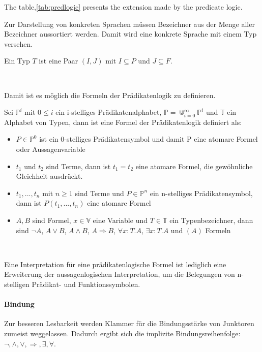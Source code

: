 The table,\ref{tab:predlogic} presents the extension made by the predicate logic.

\begin{defi}
  
\end{defi}


Zur Darstellung von konkreten Sprachen müssen Bezeichner aus der Menge aller
Bezeichner aussortiert werden. Damit wird eine konkrete Sprache mit einem Typ
versehen.
\begin{defi}
  Ein Typ $T$ ist eine Paar $(I,J)$ mit $I\subseteq P$ und $J\subseteq F$.
\end{defi}~\cite{heinemann2013logik}

Damit ist es möglich die Formeln der Prädikatenlogik zu definieren.

\begin{defi}
  Sei $\mathbb{P}^i$ mit $0\le i$ ein i-stelliges Prädikatenalphabet,
  $\mathbb{P}=\Cup^{\infty}_{i=0}\mathbb{P}^i$ und $\mathbb{T}$ ein Alphabet von Typen,
  dann ist eine Formel der Prädikatenlogik definiert als:
  \begin{itemize}
  \item $P\in\mathbb{P}^0$ ist ein 0-stelliges Prädikatensymbol und damit P eine
    atomare Formel oder Aussagenvariable
  \item $t_1$ und $t_2$ sind Terme, dann ist $t_1 = t_2$ eine atomare Formel,
    die gewöhnliche Gleichheit ausdrückt.
  \item $t_1,...,t_n$ mit $n\geq1$ sind Terme und $P\in\mathbb{P}^n$ ein n-stelliges
    Prädikatensymbol, dann ist $P(t_1,...,t_n)$ eine atomare Formel
  \item $A,B$ sind Formel, $x\in\mathbb{V}$ eine Variable und $T\in\mathbb{T}$ ein
    Typenbezeichner, dann sind $\neg A$, $A\vee B$, $A\wedge B$, $A\Rightarrow B$, $\forall x:T.A$, $\exists
    x:T.A$ und $(A)$ Formeln
  \end{itemize}
\end{defi}~\cite{kreitz1994automatisierte}

Eine Interpretation für eine prädikatenlogische Formel ist lediglich eine
Erweiterung der aussagenlogischen Interpretation, um die Belegungen von
n-stelligen Prädikat- und Funktionssymbolen.~\cite{heinemann2013logik}

\paragraph{Bindung}
Zur besseren Lesbarkeit werden Klammer für die Bindungsstärke von Junktoren
zumeist weggelassen. Dadurch ergibt sich die implizite Bindungsreihenfolge:
$\neg,\wedge,\vee,\Rightarrow,\exists,\forall$.~\cite{kreitz1994automatisierte}

